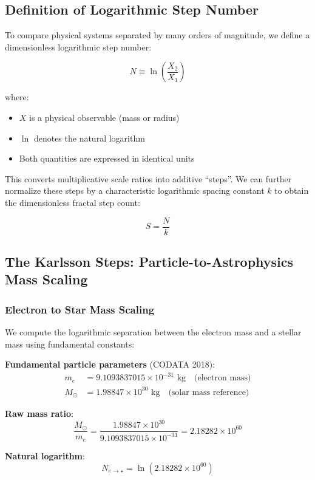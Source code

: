 \documentclass[11pt,a4paper]{article}
\begin{document}
\subsection{Definition of Logarithmic Step Number}

To compare physical systems separated by many orders of magnitude, we define a dimensionless logarithmic step number:

\[
N \equiv \ln\left(\frac{X_2}{X_1}\right)
\]

where:
\begin{itemize}
\item $X$ is a physical observable (mass or radius)
\item $\ln$ denotes the natural logarithm
\item Both quantities are expressed in identical units
\end{itemize}

This converts multiplicative scale ratios into additive ``steps''. We can further normalize these steps by a characteristic logarithmic spacing constant $k$ to obtain the dimensionless fractal step count:

\[
S = \frac{N}{k}
\]

\subsection{The Karlsson Steps: Particle-to-Astrophysics Mass Scaling}

\subsubsection{Electron to Star Mass Scaling}

We compute the logarithmic separation between the electron mass and a stellar mass using fundamental constants:

\noindent\textbf{Fundamental particle parameters} (CODATA 2018):
\begin{align*}
m_e &= 9.1093837015 \times 10^{-31} \text{ kg} \quad \text{(electron mass)}\\
M_\odot &= 1.98847 \times 10^{30} \text{ kg} \quad \text{(solar mass reference)}
\end{align*}

\noindent\textbf{Raw mass ratio}:
\[
\frac{M_\odot}{m_e} = \frac{1.98847 \times 10^{30}}{9.1093837015 \times 10^{-31}} = 2.18282 \times 10^{60}
\]

\noindent\textbf{Natural logarithm}:
\[
N_{e \to \star} = \ln(2.18282 \times 10^{60})
\]
\end{document}
